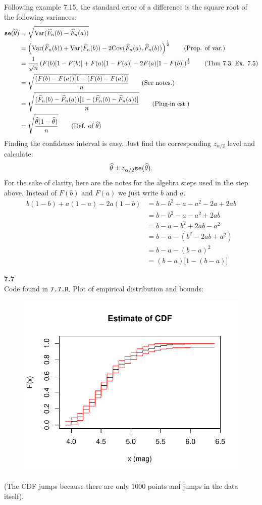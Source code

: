 Following example 7.15, the standard error of a difference is the square root of the following variances:
\begin{align*}
    \se(\thetah) &= \sqrt{\V(\hat{F}_n(b) - \hat{F}_n(a))} \\
    &= \left(\V(\hat{F}_n(b)) + \V(\hat{F}_n(b)) - 2\Cov(\hat{F}_n(a), \hat{F}_n(b))\right)^{\frac{1}{2}} \tag{Prop. of var.}\\
    &= \frac{1}{\sqrt{n}}\left(F(b)[1 - F(b)] + F(a)[1-F(a)] - 2F(a)[1-F(b)]\right)^{\frac{1}{2}} \tag{Thm 7.3, Ex. 7.5} \\
    &= \sqrt{\frac{(F(b) - F(a))[1 - (F(b) - F(a))]}{n}} \tag{See notes.}\\
    &= \sqrt{\frac{(\hat{F}_n(b) - \hat{F}_n(a))[1 - (\hat{F}_n(b) - \hat{F}_n(a))]}{n}} \tag{Plug-in est.}\\
    &= \sqrt{\frac{\thetah(1 - \thetah)}{n}} \tag{Def. of $\thetah$}
\end{align*}
Finding the confidence interval is easy. Just find the corresponding $z_{\alpha/2}$ level and calculate:
$$
\widehat{\theta} \pm z_{\alpha/2}\texttt{se}(\widehat{\theta}).
$$
For the sake of clarity, here are the notes for the algebra steps used in the step above.
Instead of $F(b)$ and $F(a)$ we just write $b$ and $a$.
\begin{align*}
    b(1-b) + a(1-a) - 2a(1-b) &= b - b^2 + a - a^2 - 2a + 2ab \\
    &= b - b^2 - a - a^2 + 2ab \\
    &= b - a - b^2 + 2ab - a^2 \\
    &= b - a - (b^2 - 2ab + a^2) \\
    &= b - a - (b-a)^2 \\
    &= (b - a)\big[1 - (b-a)\big]  
\end{align*}

\newpage\noindent
\textbf{7.7}\\  %
Code found in \texttt{7.7.R}. Plot of empirical distribution and bounds:
\begin{figure}[H]
    \centering
    \includegraphics[scale=0.7]{ch7_7.pdf}
\end{figure}
(The CDF jumps because there are only 1000 points and jumps in the data itself).

